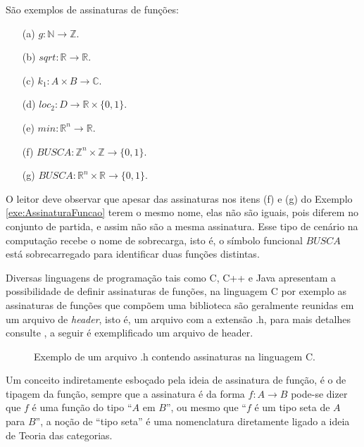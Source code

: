 \begin{example}\label{exe:AssinaturaFuncao}
	São exemplos de assinaturas de funções:
	\begin{itemize}
		\item[(a)] $g : \mathbb{N} \rightarrow \mathbb{Z}$.
		\item[(b)] $sqrt : \mathbb{R} \rightarrow \mathbb{R}$.
		\item[(c)] $k_1 : A \times B \rightarrow \mathbb{C}$.
		\item[(d)] $loc_2 : D \rightarrow \mathbb{R} \times \{0,1\}$.
		\item[(e)] $min : \mathbb{R}^n \rightarrow \mathbb{R}$.
		\item[(f)] $BUSCA : \mathbb{Z}^n \times \mathbb{Z} \rightarrow \{0,1\}$.
		\item[(g)] $BUSCA : \mathbb{R}^n \times \mathbb{R} \rightarrow \{0,1\}$.
	\end{itemize}
\end{example}

\begin{remark}
	O leitor deve observar que apesar das assinaturas nos itens (f) e (g) do Exemplo \ref{exe:AssinaturaFuncao} terem o mesmo nome, elas não são iguais, pois diferem no conjunto de partida, e assim não são a mesma assinatura. Esse tipo de cenário na computação recebe o nome de sobrecarga, isto é, o símbolo funcional $BUSCA$ está sobrecarregado para identificar duas funções distintas.
\end{remark}

Diversas linguagens de programação tais como C, C++ e Java apresentam a possibilidade de definir assinaturas de funções, na linguagem C por exemplo as assinaturas de funções que compõem uma biblioteca são geralmente reunidas em um arquivo de \textit{header}, isto é, um arquivo com a extensão .h, para mais detalhes consulte \cite{paulo2009algoritmos}, a seguir é exemplificado um arquivo de header.

\begin{figure}[h]
	
	\caption{Exemplo de um arquivo .h contendo assinaturas na linguagem C.}
	\label{fig:AssinaturasEmC}
\end{figure}

Um conceito indiretamente esboçado pela ideia de assinatura de função, é o de tipagem da função, sempre que a assinatura é da forma $f: A \rightarrow B$ pode-se dizer que $f$ é uma função do tipo ``$A$ em $B$'', ou mesmo que ``$f$ é um tipo seta de $A$ para $B$'', a noção de ``tipo seta'' é uma nomenclatura diretamente ligado a ideia de Teoria das categorias.

